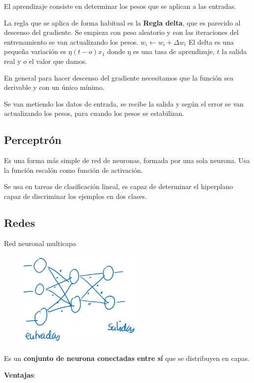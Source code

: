 \documentclass[12pt]{report} %
\begin{document}
El aprendizaje consiste en determinar los pesos que se aplican a las
entradas.

La regla que se aplica de forma habitual es la \textbf{Regla delta}, que
es parecido al descenso del gradiente. Se empieza con peso aleatorio y
con las iteraciones del entrenamiento se van actualizando los pesos.
\(w_i \leftarrow w_i+\Delta w_i\) El delta es una pequeña variación es
ŋ\((t-o)x_1\) donde ŋ es una tasa de aprendizaje, \(t\) la salida real y
\(o\) el valor que damos.

En general para hacer descenso del gradiente necesitamos que la función
sea derivable y con un único mínimo.

Se van metiendo los datos de entrada, se recibe la salida y según el
error se van actualizando los pesos, para cuando los pesos se
estabilizan.

\subsection{Perceptrón}

Es una forma más simple de red de neuronas, formada por una sola
neurona. Usa la función escalón como función de activación.

Se usa en tareas de clasificación lineal, es capaz de determinar el
hiperplano capaz de discriminar los ejemplos en dos clases.

\subsection{Redes}

Red neuronal multicapa
\begin{figure}[H]
	{\includegraphics[scale=.85]{image-20210312102144206.png}}
\end{figure}

Es un \textbf{conjunto de neurona conectadas entre sí} que se
distribuyen en capas.

\textbf{Ventajas}:
\end{document}
